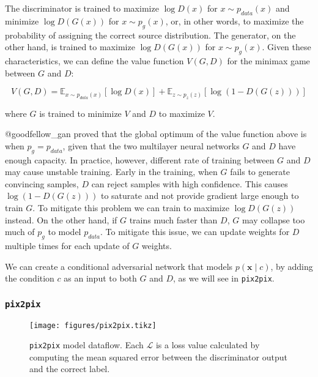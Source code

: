 \documentclass[]{article}
\begin{document}
The discriminator is trained to maximize \(\log D(x)\) for
\(x \sim p_{data}(x)\) and minimize \(\log D(G(x))\) for
\(x \sim p_g(x)\), or, in other words, to maximize the probability of
assigning the correct source distribution. The generator, on the other
hand, is trained to maximize \(\log D(G(x))\) for \(x \sim p_g(x)\).
Given these characteristics, we can define the value function
\(V(G, D)\) for the minimax game between \(G\) and \(D\):

\begin{equation}
    V(G, D) = \mathbb{E}_{x \sim p_{data}(x)}[\log D(x)] + \mathbb{E}_{z \sim p_{z}(z)}[\log (1 - D(G(z)))] \label{eq:gan}
\end{equation}

where \(G\) is trained to minimize \(V\) and \(D\) to maximize \(V\).

@goodfellow\_gan proved that the global optimum of the value function
above is when \(p_g = p_{data}\), given that the two multilayer neural
networks \(G\) and \(D\) have enough capacity. In practice, however,
different rate of training between \(G\) and \(D\) may cause unstable
training. Early in the training, when \(G\) fails to generate convincing
samples, \(D\) can reject samples with high confidence. This causes
\(\log (1 - D(G(z)))\) to saturate and not provide gradient large enough
to train \(G\). To mitigate this problem we can train to maximize
\(\log D(G(z))\) instead. On the other hand, if \(G\) trains much faster
than \(D\), \(G\) may collapse too much of \(p_g\) to model
\(p_{data}\). To mitigate this issue, we can update weights for \(D\)
multiple times for each update of \(G\) weights.

We can create a conditional adversarial network that models
\(p(\mathbf{x} \mid c)\), by adding the condition \(c\) as an input to
both \(G\) and \(D\), as we will see in \texttt{pix2pix}.

\hypertarget{pix2pix}{%
\subsubsection{\texorpdfstring{\texttt{pix2pix}}{pix2pix}}\label{pix2pix}}

\begin{figure}[h]
    \texttt{[image: figures/pix2pix.tikz]}
\centering
\caption{\texttt{pix2pix} model dataflow. Each $\mathcal{L}$ is a loss value calculated by computing the mean squared error between the discriminator output and the correct label. \label{fig:pix2pix}}
\end{figure}
\end{document}
